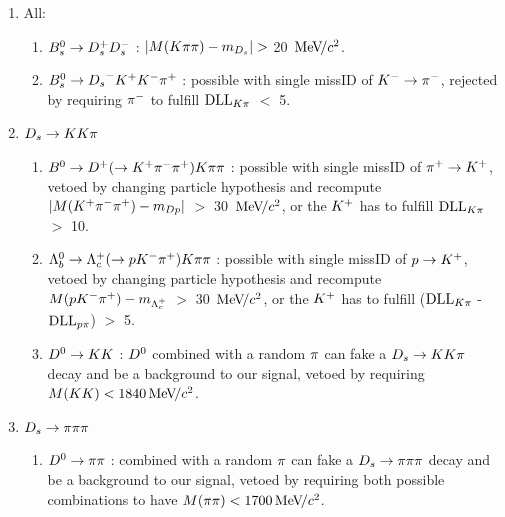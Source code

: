\begin{enumerate}

\item All:

\begin{enumerate}

\item $\Bs\to\Dsp\Dsm$ : $|M(\kaon\pion\pion) - m_{\Ds}| >$ 20 $\mevcc$.

\item $\Bs\to\Ds^{-}\Kp\Km\pip$ : possible with single missID of $\Km\rightarrow\pim$, rejected by requiring $\pim$ to fulfill $\dllkpi$ $<$ 5. 

\end{enumerate}

\item $\Ds\to\kaon\kaon\pion$

\begin{enumerate}

\item $\Bz\to\Dp(\to\Kp\pim\pip)\kaon\pion\pion$ : possible with single missID of $\pip\rightarrow\Kp$, vetoed by changing particle hypothesis and recompute $|M(\Kp\pim\pip) - m_{Dp}|$ $>$ 30 $\mevcc$, 
or the $\Kp$ has to fulfill $\dllkpi$ $>$ 10.

\item $\Lb\to\Lc(\to\proton\Km\pip)\kaon\pion\pion$ : possible with single missID of $\proton\rightarrow\Kp$, vetoed by changing particle hypothesis and recompute $M(\proton\Km\pip) - m_{\Lc}$ $>$ 30 $\mevcc$, 
or the $\Kp$ has to fulfill ($\dllkpi$ - $\dllppi$) $>$ 5.

\item $\Dz\to\kaon\kaon$ : $\Dz$ combined with a random $\pion$ can fake a $\Ds\to\kaon\kaon\pion$ decay and be a background to our signal, vetoed by requiring $M(\kaon\kaon) < 1840 \mevcc$. 

\end{enumerate}


\item $\Ds\to\pion\pion\pion$

\begin{enumerate}

\item $\Dz\to\pion\pion$ : combined with a random $\pion$ can fake a $\Ds\to\pion\pion\pion$ decay and be a background to our signal, vetoed by requiring both possible combinations to have $M(\pion\pion) < 1700 \mevcc$.

\end{enumerate}

\end{enumerate}

